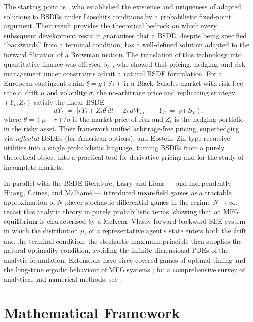 The starting point is \citet{pardoux1990}, who established the
existence and uniqueness of adapted solutions to BSDEs under Lipschitz
conditions by a probabilistic fixed-point argument.  Their result
provides the theoretical bedrock on which every subsequent development
rests: it guarantees that a BSDE, despite being specified ``backwards''
from a terminal condition, has a well-defined solution adapted to the
forward filtration of a Brownian motion.  The translation of this
technology into quantitative finance was effected by
\citet{elkaroui1997}, who showed that pricing, hedging, and risk
management under constraints admit a natural BSDE formulation.
For a European contingent claim $\xi = g(S_T)$ in a
Black--Scholes market with risk-free rate $r$, drift $\mu$ and
volatility $\sigma$, the no-arbitrage price and replicating
strategy $(Y_t, Z_t)$ satisfy the linear BSDE
\[
  -dY_t \;=\; \bigl[r Y_t + Z_t \theta\bigr] dt - Z_t\, dW_t,
  \qquad Y_T \;=\; g(S_T),
\]
where $\theta = (\mu - r)/\sigma$ is the market price of risk and
$Z_t$ is the hedging portfolio in the risky asset.  Their
framework unified arbitrage-free pricing, superhedging via
\emph{reflected} BSDEs (for American options), and Epstein--Zin-type
recursive utilities into a single probabilistic language, turning
BSDEs from a purely theoretical object into a practical tool for
derivative pricing and for the study of incomplete markets.

In parallel with the BSDE literature, Lasry and Lions --- and
independently Huang, Caines, and Malham\'{e} --- introduced
mean-field games as a tractable approximation of $N$-player
stochastic differential games in the regime $N \to \infty$.
\citet{carmona2013} recast this analytic theory in purely
probabilistic terms, showing that an MFG equilibrium is
characterised by a McKean--Vlasov forward-backward SDE system in
which the distribution $\mu_t$ of a representative agent's state
enters both the drift and the terminal condition; the stochastic
maximum principle then supplies the natural optimality condition,
avoiding the infinite-dimensional PDEs of the analytic formulation.
Extensions have since covered games of optimal timing
\citep{carmona2017} and the long-time ergodic behaviour of MFG
systems \citep{cardaliaguet2012}; for a comprehensive survey of
analytical and numerical methods, see \citet{achdou2020}.

\section{Mathematical Framework}\label{sec:lit-math}

